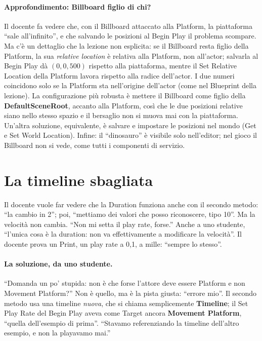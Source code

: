 \paragraph{Approfondimento: Billboard figlio di chi?} Il docente fa vedere che, con il
Billboard attaccato alla Platform, la piattaforma ``sale all'infinito'', e che salvando le
posizioni al Begin Play il problema scompare. Ma c'è un dettaglio che la lezione non
esplicita: se il Billboard resta figlio della Platform, la sua \emph{relative location}
è relativa alla Platform, non all'actor; salvarla al Begin Play dà $(0, 0, 500)$ rispetto
alla piattaforma, mentre il Set Relative Location della Platform lavora rispetto alla
radice dell'actor. I due numeri coincidono solo se la Platform sta nell'origine
dell'actor (come nel Blueprint della lezione). La configurazione più robusta è mettere il
Billboard come figlio della \textbf{DefaultSceneRoot}, accanto alla Platform, così che
le due posizioni relative siano nello stesso spazio e il bersaglio non si muova mai con
la piattaforma. Un'altra soluzione, equivalente, è salvare e impostare le posizioni nel
mondo (Get e Set World Location). Infine: il ``dinosauro'' è visibile solo nell'editor;
nel gioco il Billboard non si vede, come tutti i componenti di servizio.

\section{La timeline sbagliata}
\label{ue6:sec:timelinesbagliata}

Il docente vuole far vedere che la Duration funziona anche con il secondo metodo: ``la
cambio in 2''; poi, ``mettiamo dei valori che posso riconoscere, tipo 10''. Ma la
velocità non cambia. ``Non mi setta il play rate, forse.'' Anche a uno studente,
``l'unica cosa è la duration: non va effettivamente a modificare la velocità''. Il
docente prova un Print, un play rate a 0,1, a mille: ``sempre lo stesso''.

\paragraph{La soluzione, da uno studente.} ``Domanda un po' stupida: non è che forse
l'attore deve essere Platform e non Movement Platform?'' Non è quello, ma è la pista
giusta: ``errore mio''. Il secondo metodo usa una timeline \emph{nuova}, che si chiama
semplicemente \textbf{Timeline}; il Set Play Rate del Begin Play aveva come Target ancora
\textbf{Movement Platform}, ``quella dell'esempio di prima''. ``Stavamo referenziando la
timeline dell'altro esempio, e non la playavamo mai.''

